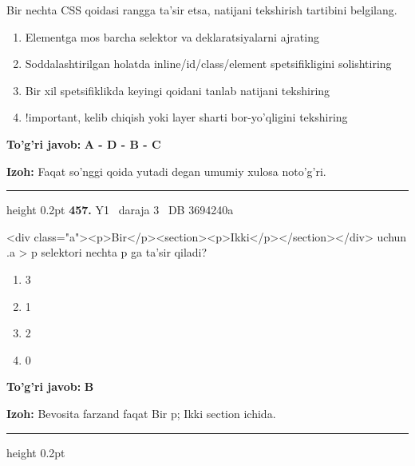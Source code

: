 \documentclass[10pt,a4paper,oneside]{article}
\begin{document}
\par
Bir nechta CSS qoidasi rangga ta'sir etsa, natijani tekshirish tartibini belgilang.
\begin{enumerate}[label=\Alph*),leftmargin=9mm]
\item Elementga mos barcha selektor va deklaratsiyalarni ajrating
\item Soddalashtirilgan holatda inline/id/class/element spetsifikligini solishtiring
\item Bir xil spetsifiklikda keyingi qoidani tanlab natijani tekshiring
\item !important, kelib chiqish yoki layer sharti bor-yo'qligini tekshiring
\end{enumerate}
\begin{tcolorbox}[enhanced,breakable,colback=teal!4,colframe=teal!45!black,boxrule=0.45pt,arc=1.2mm,left=2.8mm,right=2.8mm,top=2mm,bottom=2mm,before skip=2mm,after skip=2mm]
\textbf{\color{teal}To'g'ri javob:} \textbf{A - D - B - C}
\par\smallskip
\textbf{Izoh:} Faqat so'nggi qoida yutadi degan umumiy xulosa noto'g'ri.
\end{tcolorbox}
\vspace{2mm}\hrule height 0.2pt \vspace{4mm}
\hypertarget{q457}{\textbf{\color{ink}457.}}  {\color{muted}\scriptsize Y1 \textbullet\ daraja 3 \textbullet\ DB 3694240a}
\par
\textless{}div class="a"\textgreater{}\textless{}p\textgreater{}Bir\textless{}/p\textgreater{}\textless{}section\textgreater{}\textless{}p\textgreater{}Ikki\textless{}/p\textgreater{}\textless{}/section\textgreater{}\textless{}/div\textgreater{} uchun .a \textgreater{} p selektori nechta p ga ta'sir qiladi?
\begin{enumerate}[label=\Alph*),leftmargin=9mm]
\item 3
\item 1
\item 2
\item 0
\end{enumerate}
\begin{tcolorbox}[enhanced,breakable,colback=teal!4,colframe=teal!45!black,boxrule=0.45pt,arc=1.2mm,left=2.8mm,right=2.8mm,top=2mm,bottom=2mm,before skip=2mm,after skip=2mm]
\textbf{\color{teal}To'g'ri javob:} \textbf{B}
\par\smallskip
\textbf{Izoh:} Bevosita farzand faqat Bir p; Ikki section ichida.
\end{tcolorbox}
\vspace{2mm}\hrule height 0.2pt \vspace{4mm}
\end{document}
